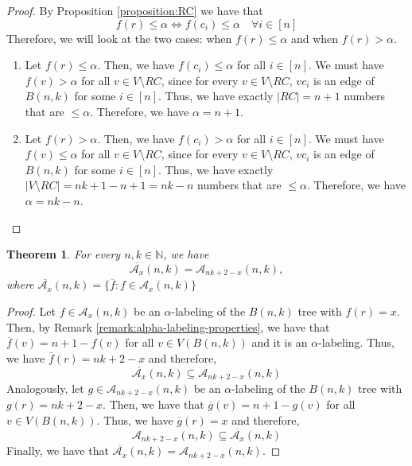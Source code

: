 \documentclass[10pt]{article}
\newtheorem{theorem}{Theorem}
\theoremstyle{definition}
\begin{document}
\begin{proof}
  By Proposition \ref{proposition:RC} we have that
  $$
  f(r) \le \alpha \iff f(c_i) \le \alpha \quad \forall i \in [n]
  $$
  Therefore, we will look at the two cases: when $f(r) \le \alpha$ and when $f(r) > \alpha$.
  \begin{enumerate}
    \item Let $f(r) \le \alpha$. Then, we have $f(c_i) \le \alpha$ for all $i \in [n]$. We must have $f(v) > \alpha$ for all $v \in V \setminus RC$, since for every $v \in V \setminus RC$, $v c_i$ is an edge of $B(n, k)$ for some $i \in [n]$. Thus, we have exactly $|RC| = n + 1$ numbers that are $\le \alpha$. Therefore, we have $\alpha = n + 1$.

    \item Let $f(r) > \alpha$. Then, we have $f(c_i) > \alpha$ for all $i \in [n]$. We must have $f(v) \le \alpha$ for all $v \in V \setminus RC$, since for every $v \in V \setminus RC$, $v c_i$ is an edge of $B(n, k)$ for some $i \in [n]$. Thus, we have exactly $|V \setminus RC| = nk + 1 - n + 1 = nk - n$ numbers that are $\le \alpha$. Therefore, we have $\alpha = nk - n$.
  \end{enumerate}
\end{proof}

\begin{theorem}
  \label{thm:complementarity}
  For every $n, k \in \mathbb{N}$, we have
  $$
  \overline{\mathcal{A}_x}(n, k) = \mathcal{A}_{nk + 2 - x}(n, k),
  $$
  where $\overline{\mathcal{A}_x}(n, k) = \{\overline{f} : f \in \mathcal{A}_x(n, k)\}$
\end{theorem}

\begin{proof}
  Let $f \in \mathcal{A}_x(n, k)$ be an $\alpha$-labeling of the $B(n, k)$ tree with $f(r) = x$. Then, by Remark \ref{remark:alpha-labeling-properties}, we have that $\overline{f}(v) = n + 1 - f(v)$ for all $v \in V(B(n, k))$ and it is an $\alpha$-labeling. Thus, we have $\overline{f}(r) = nk + 2 - x$ and therefore,
  $$
  \overline{\mathcal{A}_x}(n, k) \subseteq \mathcal{A}_{nk + 2 - x}(n, k)
  $$
  Analogously, let $g \in \mathcal{A}_{nk + 2 - x}(n, k)$ be an $\alpha$-labeling of the $B(n, k)$ tree with $g(r) = nk + 2 - x$. Then, we have that $\overline{g}(v) = n + 1 - g(v)$ for all $v \in V(B(n, k))$. Thus, we have $\overline{g}(r) = x$ and therefore,
  $$
  \mathcal{A}_{nk + 2 - x}(n, k) \subseteq \overline{\mathcal{A}_x}(n, k)
  $$
  Finally, we have that $\overline{\mathcal{A}_x}(n, k) = \mathcal{A}_{nk + 2 - x}(n, k)$.
\end{proof}
\end{document}

